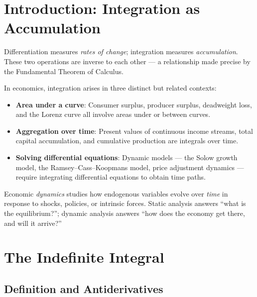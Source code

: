 \documentclass[12pt, a4paper]{article}
\theoremstyle{definition}
\begin{document}
\newpage\tableofcontents\newpage

\section{Introduction: Integration as Accumulation}

Differentiation measures \emph{rates of change}; integration measures
\emph{accumulation}. These two operations are inverse to each other ---
a relationship made precise by the Fundamental Theorem of Calculus.

In economics, integration arises in three distinct but related contexts:

\begin{itemize}
  \item \textbf{Area under a curve}: Consumer surplus, producer surplus,
        deadweight loss, and the Lorenz curve all involve areas under or
        between curves.
  \item \textbf{Aggregation over time}: Present values of continuous income
        streams, total capital accumulation, and cumulative production are
        integrals over time.
  \item \textbf{Solving differential equations}: Dynamic models --- the Solow
        growth model, the Ramsey--Cass--Koopmans model, price adjustment
        dynamics --- require integrating differential equations to obtain
        time paths.
\end{itemize}

Economic \emph{dynamics} studies how endogenous variables evolve over
\emph{time} in response to shocks, policies, or intrinsic forces. Static
analysis answers ``what is the equilibrium?''; dynamic analysis answers
``how does the economy get there, and will it arrive?''

\section{The Indefinite Integral}

\subsection{Definition and Antiderivatives}
\end{document}
